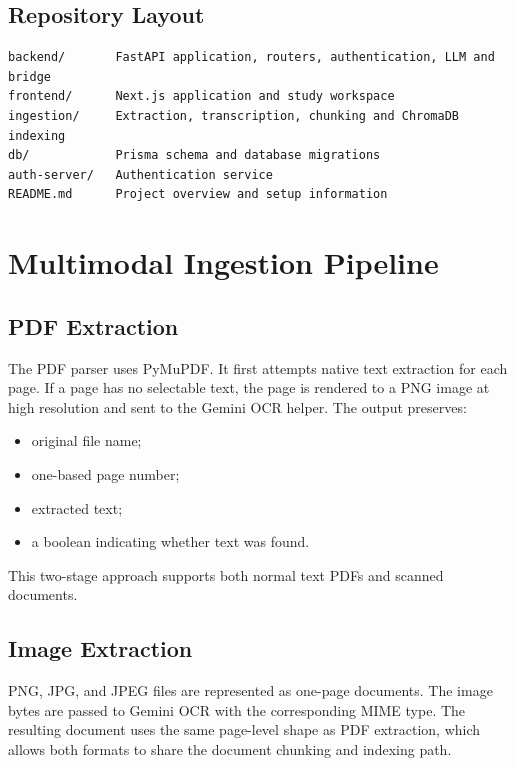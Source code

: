 \documentclass[11pt,a4paper]{article}
\begin{document}
\subsection{Repository Layout}

\begin{lstlisting}[language={},caption={Relevant repository directories}]
backend/       FastAPI application, routers, authentication, LLM and bridge
frontend/      Next.js application and study workspace
ingestion/     Extraction, transcription, chunking and ChromaDB indexing
db/            Prisma schema and database migrations
auth-server/   Authentication service
README.md      Project overview and setup information
\end{lstlisting}

\section{Multimodal Ingestion Pipeline}

\subsection{PDF Extraction}

The PDF parser uses PyMuPDF. It first attempts native text extraction for each
page. If a page has no selectable text, the page is rendered to a PNG image at
high resolution and sent to the Gemini OCR helper. The output preserves:

\begin{itemize}[leftmargin=*]
  \item original file name;
  \item one-based page number;
  \item extracted text;
  \item a boolean indicating whether text was found.
\end{itemize}

This two-stage approach supports both normal text PDFs and scanned documents.

\subsection{Image Extraction}

PNG, JPG, and JPEG files are represented as one-page documents. The image bytes
are passed to Gemini OCR with the corresponding MIME type. The resulting
document uses the same page-level shape as PDF extraction, which allows both
formats to share the document chunking and indexing path.
\end{document}
